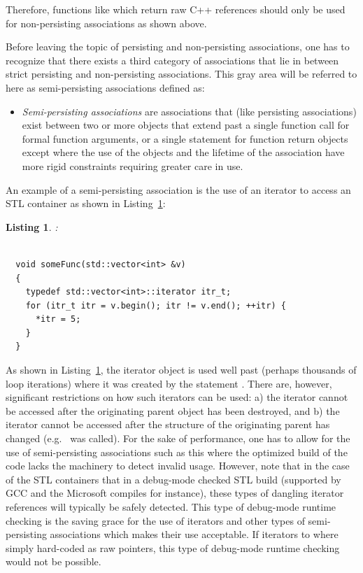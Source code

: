 \documentclass[pdf,ps2pdf,11pt]{SANDreport}
\newtheorem{listing}{Listing}
\begin{document}
Therefore, functions like {}
which return raw C++ references should only be used for non-persisting
associations as shown above.

Before leaving the topic of persisting and non-persisting associations, one
has to recognize that there exists a third category of associations that lie
in between strict persisting and non-persisting associations.  This gray area
will be referred to here as semi-persisting associations defined as:

\begin{itemize}

{}\item\textit{Semi-persisting associations} are associations that (like
persisting associations) exist between two or more objects that extend past a
single function call for formal function arguments, or a single statement for
function return objects except where the use of the objects and the lifetime
of the association have more rigid constraints requiring greater care in use.

\end{itemize}

An example of a semi-persisting association is the use of an iterator
to access an STL container as shown in
Listing~\ref{listing:SemiPersistingIterators}:


\begin{listing}:\\
\label{listing:SemiPersistingIterators}
{\small\begin{verbatim}

  void someFunc(std::vector<int> &v)
  {
    typedef std::vector<int>::iterator itr_t;
    for (itr_t itr = v.begin(); itr != v.end(); ++itr) {
      *itr = 5;
    }
  }
\end{verbatim}}
\end{listing}


As shown in Listing~\ref{listing:SemiPersistingIterators}, the
iterator object {} is used well past (perhaps thousands of
loop iterations) where it was created by the statement {}.  There are, however, significant restrictions on how
such iterators can be used: a) the iterator cannot be accessed after
the originating parent object has been destroyed, and b) the iterator
cannot be accessed after the structure of the originating parent has
changed (e.g.\ {} was called).  For the sake of
performance, one has to allow for the use of semi-persisting
associations such as this where the optimized build of the code lacks
the machinery to detect invalid usage.  However, note that in the case
of the STL containers that in a debug-mode checked STL build
(supported by GCC and the Microsoft compiles for instance), these
types of dangling iterator references will typically be safely
detected.  This type of debug-mode runtime checking is the saving
grace for the use of iterators and other types of semi-persisting
associations which makes their use acceptable.  If iterators to
{} where simply hard-coded as raw pointers, this type
of debug-mode runtime checking would not be possible.
\end{document}
